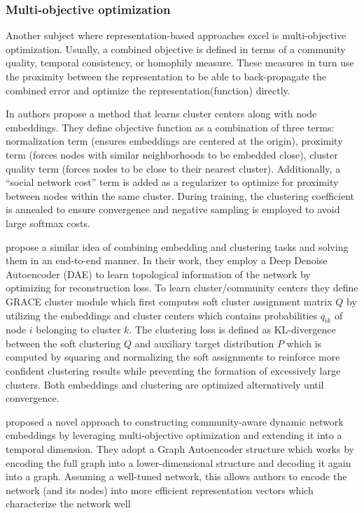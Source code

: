 \documentclass[
acmsmall,
nonacm,
screen,
acmthm]{acmart}
\begin{document}
\hypertarget{multi-objective-optimization}{%
\subsubsection{Multi-objective
optimization}\label{multi-objective-optimization}}

Another subject where representation-based approaches excel is
multi-objective optimization. Usually, a combined objective is defined
in terms of a community quality, temporal consistency, or homophily
measure. These measures in turn use the proximity between the
representation to be able to back-propagate the combined error and
optimize the representation(function) directly.

In \citet{rozemberczkiGEMSECGraphEmbedding2019} authors propose a method
that learns cluster centers along with node embeddings. They define
objective function as a combination of three terms: normalization term
(ensures embeddings are centered at the origin), proximity term (forces
nodes with similar neighborhoods to be embedded close), cluster quality
term (forces nodes to be close to their nearest cluster). Additionally,
a ``social network cost'' term is added as a regularizer to optimize for
proximity between nodes within the same cluster. During training, the
clustering coefficient is annealed to ensure convergence and negative
sampling is employed to avoid large softmax costs.

\citet{yangGraphClusteringDynamic2017} propose a similar idea of
combining embedding and clustering tasks and solving them in an
end-to-end manner. In their work, they employ a Deep Denoise Autoencoder
(DAE) to learn topological information of the network by optimizing for
reconstruction loss. To learn cluster/community centers they define
GRACE cluster module which first computes soft cluster assignment matrix
\(Q\) by utilizing the embeddings and cluster centers which contains
probabilities \(q_{ik}\) of node \(i\) belonging to cluster \(k\). The
clustering loss is defined as KL-divergence between the soft clustering
\(Q\) and auxiliary target distribution \(P\) which is computed by
squaring and normalizing the soft assignments to reinforce more
confident clustering results while preventing the formation of
excessively large clusters. Both embeddings and clustering are optimized
alternatively until convergence.

\citet{maCommunityawareDynamicNetwork2020} proposed a novel approach to
constructing community-aware dynamic network embeddings by leveraging
multi-objective optimization and extending it into a temporal dimension.
They adopt a Graph Autoencoder structure which works by encoding the
full graph into a lower-dimensional structure and decoding it again into
a graph. Assuming a well-tuned network, this allows authors to encode
the network (and its nodes) into more efficient representation vectors
which characterize the network well
\end{document}
